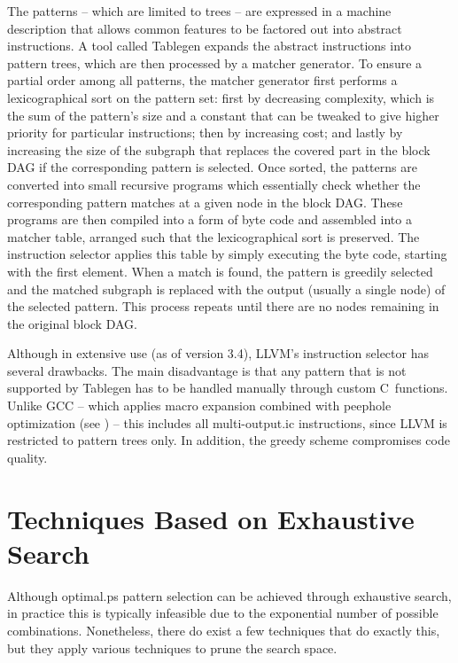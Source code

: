 The \glspl{pattern} -- which are limited to \glspl{tree} -- are expressed in a
\gls{machine description} that allows common features to be factored out into
abstract \glspl{instruction}.
%
A tool called \gls{Tablegen} expands the abstract
\glspl{instruction} into \glspl{pattern tree}, which are then processed by a
matcher generator.
%
To ensure a partial order among all \glspl{pattern}, the
matcher generator first performs a lexicographical sort on the \gls{pattern
  set}: first by decreasing complexity, which is the sum of the \gls{pattern}'s
size and a constant that can be tweaked to give higher priority for particular
\glspl{instruction}; then by increasing cost; and lastly by increasing the size
of the \gls{subgraph} that replaces the covered part in the \gls{block DAG} if
the corresponding \gls{pattern} is selected.
%
Once sorted, the \glspl{pattern}
are converted into small recursive \glspl{program} which essentially check
whether the corresponding \gls{pattern} matches at a given \gls{node} in the
\gls{block DAG}.
%
These \glspl{program} are then compiled into a form of byte
code and assembled into a matcher table, arranged such that the lexicographical
sort is preserved.
%
The \gls{instruction selector} applies this table by simply
executing the byte code, starting with the first element.
%
When a \gls{match} is
found, the \gls{pattern} is greedily selected and the matched \gls{subgraph} is
replaced with the output (usually a single \gls{node}) of the selected
\gls{pattern}.
%
This process repeats until there are no \glspl{node} remaining in
the original \gls{block DAG}.

Although in extensive use (as of version 3.4), \gls{LLVM}'s \gls{instruction
  selector} has several drawbacks.
%
The main disadvantage is that any
\gls{pattern} that is not supported by \gls{Tablegen} has to be handled manually
through custom \gls{C}~functions.
%
Unlike \gls{GCC} -- which applies \gls{macro
  expansion} combined with \gls{peephole optimization} (see
) -- this includes all
\gls{multi-output.ic} \glspl{instruction}, since \gls{LLVM} is restricted to
\glspl{pattern tree} only.
%
In addition, the greedy scheme compromises code
quality.


\section{Techniques Based on Exhaustive Search}

Although \gls{optimal.ps} \gls{pattern selection} can be achieved through
exhaustive search, in practice this is typically infeasible due to the
exponential number of possible combinations.
%
Nonetheless, there do exist a few
techniques that do exactly this, but they apply various techniques to prune the
search space.


